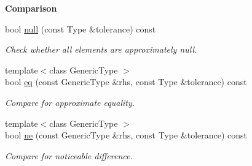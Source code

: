 \begin{Indent}{\bf Comparison}\par
\begin{DoxyCompactItemize}
\item 
bool \hyperlink{classmagrathea_1_1AbstractNArray_a9420957a2c275a4eb7027d776cece234}{null} (const Type \&tolerance) const 
\begin{DoxyCompactList}\small\item\em Check whether all elements are approximately null. \end{DoxyCompactList}\item 
{\footnotesize template$<$class Generic\-Type $>$ }\\bool \hyperlink{classmagrathea_1_1AbstractNArray_aa945ee5d184d72a020af01fa6d2a733a}{eq} (const Generic\-Type \&rhs, const Type \&tolerance) const 
\begin{DoxyCompactList}\small\item\em Compare for approximate equality. \end{DoxyCompactList}\item 
{\footnotesize template$<$class Generic\-Type $>$ }\\bool \hyperlink{classmagrathea_1_1AbstractNArray_affd889aba3a3de7e9a6710b9f69bd933}{ne} (const Generic\-Type \&rhs, const Type \&tolerance) const 
\begin{DoxyCompactList}\small\item\em Compare for noticeable difference. \end{DoxyCompactList}\end{DoxyCompactItemize}
\end{Indent}

